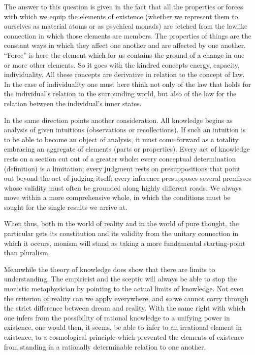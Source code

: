 \documentclass[12pt,a4paper]{book}
\newcommand{\opage}[1]{\marginnote{\footnotesize\textit{[#1]}}}
\begin{document}
The answer to this question is given in the fact that all the properties or
forces with which we equip the elements of existence (whether we represent them
to ourselves as material atoms or as psychical monads) are fetched from the
lawlike connection in which those elements are members. The properties of things
are the constant ways in which they affect one another and are affected by one
another. ``Force'' is here the element which for us contains the ground of a
change in one or more other elements. So it goes with the kindred concepts
energy, capacity, individuality. All these concepts are derivative in relation to
the concept of law. In the case of individuality one must here think not only of
the law that holds \opage{61}for the individual's relation to the surrounding world, but
also of the law for the relation between the individual's inner states.

In the same direction points another consideration. All knowledge begins as
analysis of given intuitions (observations or recollections). If such an
intuition is to be able to become an object of analysis, it must come forward as
a totality embracing an aggregate of elements (parts or properties). Every act of
knowledge rests on a section cut out of a greater whole: every conceptual
determination (definition) is a limitation; every judgment rests on
presuppositions that point out beyond the act of judging itself; every inference
presupposes several premisses whose validity must often be grounded along highly
different roads. We always move within a more comprehensive whole, in which the
conditions must be sought for the single results we arrive at.

When thus, both in the world of reality and in the world of pure thought, the
particular gets its constitution and its validity from the unitary connection in
which it occurs, monism will stand as taking a more fundamental starting-point
than pluralism.

Meanwhile the theory of knowledge does show that there are limits to
understanding. The empiricist and the sceptic will always be able to stop the
monistic metaphysician by pointing to the actual limits of knowledge. Not even
the criterion of reality can we apply everywhere, and so we cannot carry through
the strict difference between dream and reality. With the same right with which
one infers from the possibility of rational knowledge to a unifying power in
existence, one would then, it seems, be able to infer to an irrational element in
existence, to a cosmological principle which prevented the elements of existence
from standing in a rationally determinable relation to one another.
\end{document}
